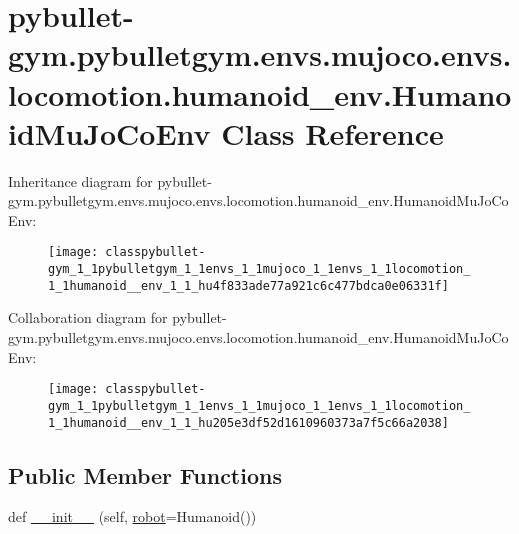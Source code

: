 \hypertarget{classpybullet-gym_1_1pybulletgym_1_1envs_1_1mujoco_1_1envs_1_1locomotion_1_1humanoid__env_1_1_humanoid_mu_jo_co_env}{}\section{pybullet-\/gym.pybulletgym.\+envs.\+mujoco.\+envs.\+locomotion.\+humanoid\+\_\+env.\+Humanoid\+Mu\+Jo\+Co\+Env Class Reference}
\label{classpybullet-gym_1_1pybulletgym_1_1envs_1_1mujoco_1_1envs_1_1locomotion_1_1humanoid__env_1_1_humanoid_mu_jo_co_env}


Inheritance diagram for pybullet-\/gym.pybulletgym.\+envs.\+mujoco.\+envs.\+locomotion.\+humanoid\+\_\+env.\+Humanoid\+Mu\+Jo\+Co\+Env\+:
\nopagebreak
\begin{figure}[H]
\begin{center}
\leavevmode
\texttt{[image: classpybullet-gym\_1\_1pybulletgym\_1\_1envs\_1\_1mujoco\_1\_1envs\_1\_1locomotion\_1\_1humanoid\_\_env\_1\_1\_hu4f833ade77a921c6c477bdca0e06331f]}
\end{center}
\end{figure}


Collaboration diagram for pybullet-\/gym.pybulletgym.\+envs.\+mujoco.\+envs.\+locomotion.\+humanoid\+\_\+env.\+Humanoid\+Mu\+Jo\+Co\+Env\+:
\nopagebreak
\begin{figure}[H]
\begin{center}
\leavevmode
\texttt{[image: classpybullet-gym\_1\_1pybulletgym\_1\_1envs\_1\_1mujoco\_1\_1envs\_1\_1locomotion\_1\_1humanoid\_\_env\_1\_1\_hu205e3df52d1610960373a7f5c66a2038]}
\end{center}
\end{figure}
\subsection*{Public Member Functions}
\begin{DoxyCompactItemize}
\item 
def \hyperlink{classpybullet-gym_1_1pybulletgym_1_1envs_1_1mujoco_1_1envs_1_1locomotion_1_1humanoid__env_1_1_humanoid_mu_jo_co_env_a01506b1454254752466631679fdae8d9}{\+\_\+\+\_\+init\+\_\+\+\_\+} (self, \hyperlink{classpybullet-gym_1_1pybulletgym_1_1envs_1_1mujoco_1_1envs_1_1locomotion_1_1humanoid__env_1_1_humanoid_mu_jo_co_env_a7cd2a970281936230cdd61ff14bee88a}{robot}=Humanoid())
\end{DoxyCompactItemize}

